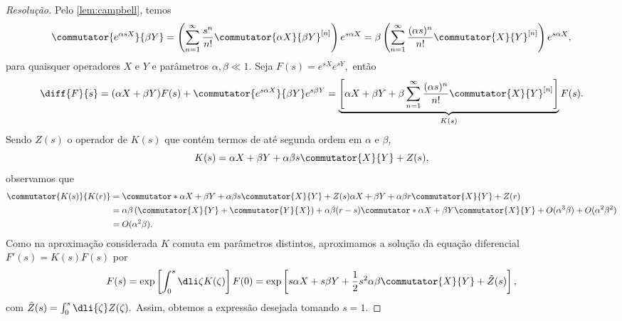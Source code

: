 \begin{proof}[Resolução]
    Pelo \cref{lem:campbell}, temos
    \begin{equation*}
        \commutator{e^{\alpha sX}}{\beta Y} = \left(\sum_{n = 1}^\infty \frac{s^n}{n!} \commutator{\alpha X}{\beta Y}^{[n]}\right)e^{s \alpha X} = \beta \left(\sum_{n = 1}^\infty \frac{(\alpha s)^n}{n!} \commutator{X}{Y}^{[n]}\right)e^{s \alpha X},
    \end{equation*}
    para quaisquer operadores \(X\) e \(Y\) e parâmetros \(\alpha, \beta \ll 1\). Seja \(F(s) = e^{sX}e^{sY},\) então
    \begin{equation*}
        \diff{F}{s} = (\alpha X + \beta Y)F(s) + \commutator{e^{s \alpha X}}{\beta Y} e^{s \beta Y} = \underbrace{\left[\alpha X + \beta Y + \beta \sum_{n = 1}^\infty \frac{(\alpha s)^n}{n!} \commutator{X}{Y}^{[n]}\right]}_{K(s)} F(s).
    \end{equation*}
    Sendo \(Z(s)\) o operador de \(K(s)\) que contém termos de até segunda ordem em \(\alpha\) e \(\beta\),
    \begin{equation*}
        K(s) = \alpha X + \beta Y + \alpha \beta s \commutator{X}{Y} + Z(s),
    \end{equation*}
    observamos que
    \begin{align*}
        \commutator{K(s)}{K(r)} &= \commutator*{\alpha X + \beta Y + \alpha \beta s \commutator{X}{Y} + Z(s)}{\alpha X + \beta Y + \alpha \beta r \commutator{X}{Y} + Z(r)}\\
                                &= \alpha \beta \left(\commutator{X}{Y} + \commutator{Y}{X}\right) + \alpha \beta (r - s) \commutator*{\alpha X+\beta Y}{\commutator{X}{Y}} + O(\alpha^3 \beta) + O(\alpha^2 \beta^2)\\
                                &= O(\alpha^2 \beta).
    \end{align*}
    Como na aproximação considerada \(K\) comuta em parâmetros distintos, aproximamos a solução da equação diferencial \(F'(s) = K(s) F(s)\) por
    \begin{equation*}
        F(s) = \exp\left[\int_0^s \dli\zeta K(\zeta)\right] F(0) = \exp\left[s \alpha X + s \beta Y + \frac12 s^2 \alpha \beta \commutator{X}{Y} + \tilde{Z}(s)\right],
    \end{equation*}
    com \(\tilde{Z}(s) = \int_0^s \dli{\zeta} Z(\zeta).\) Assim, obtemos a expressão desejada tomando \(s = 1.\)
\end{proof}
